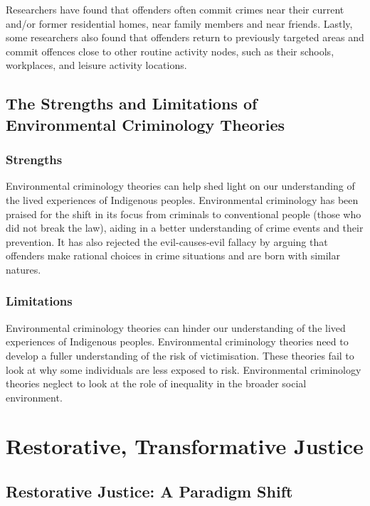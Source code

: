 \documentclass{article}
\begin{document}
Researchers have found that offenders often commit crimes near their current and/or former residential homes, near family members  and near friends. Lastly, some researchers also found that offenders return to previously targeted areas and commit offences close to other routine activity nodes, such as their schools, workplaces, and leisure activity locations.

\subsection{The Strengths and Limitations of Environmental Criminology Theories}

\subsubsection*{Strengths}

Environmental criminology theories can help shed light on our understanding of the lived experiences of Indigenous peoples. Environmental criminology has been praised for the shift in its focus from criminals to conventional people (those who did not break the law), aiding in a better understanding of crime events and their prevention. It has also rejected the evil-causes-evil fallacy by arguing that offenders make rational choices in crime situations and are born with similar natures.

\subsubsection*{Limitations}

Environmental criminology theories can hinder our understanding of the lived experiences of Indigenous peoples. Environmental criminology theories need to develop a fuller understanding of the risk of victimisation. These theories fail to look at why some individuals are less exposed to risk. Environmental criminology theories neglect to look at the role of inequality in the broader social environment.

\section{Restorative, Transformative Justice}

\subsection{Restorative Justice: A Paradigm Shift}
\end{document}

